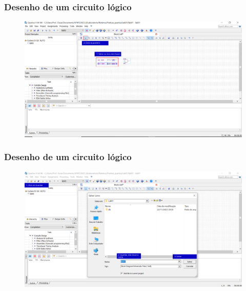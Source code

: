 \documentclass{CPSPresentation}
\begin{document}
\begin{frame}
	\frametitle{Desenho de um circuito lógico}
	
	
	\begin{figure}[h]
		\centering
		\includegraphics[width=1.02\textwidth]{quartus/fig10.pdf}
	\end{figure}
	
	
\end{frame}
\begin{frame}
	\frametitle{Desenho de um circuito lógico}
	
	
	\begin{figure}[h]
		\centering
		\includegraphics[width=1.02\textwidth]{quartus/fig11.pdf}
	\end{figure}
	
	
\end{frame}
\end{document}
